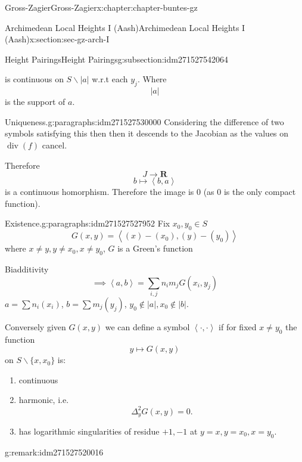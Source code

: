 \documentclass[oneside,10pt,]{book}
\numberwithin{equation}{section}
\newcommand{\pair}[2]{\left\langle #1, #2 \right\rangle}
\newcommand{\RR}{\mathbf{R}}
\DeclareMathOperator{\divisor}{div}
\begin{document}
\begin{chapterptx}{Gross-Zagier}{}{Gross-Zagier}{}{}{x:chapter:chapter-buntes-gz}
\begin{sectionptx}{Archimedean Local Heights I (Aash)}{}{Archimedean Local Heights I (Aash)}{}{}{x:section:sec-gz-arch-I}
\begin{subsectionptx}{Height Pairings}{}{Height Pairings}{}{}{g:subsection:idm271527542064}
\begin{enumerate}
\begin{equation*}
\end{equation*}
is continuous on \(S\smallsetminus |a|\) w.r.t each \(y_j\). Where%
\begin{equation*}
|a|
\end{equation*}
is the support of \(a\).%
\end{enumerate}
%
\begin{paragraphs}{Uniqueness.}{g:paragraphs:idm271527530000}%
Considering the difference of two symbols satisfying this then then it descends to the Jacobian as the values on \(\divisor(f)\) cancel.%
\par
Therefore%
\begin{equation*}
J\to \RR
\end{equation*}
%
\begin{equation*}
b\mapsto \pair b a
\end{equation*}
is a continuous homorphism. Therefore the image is 0 (as 0 is the only compact function).%
\end{paragraphs}%
\begin{paragraphs}{Existence.}{g:paragraphs:idm271527527952}%
Fix \(x_0, y_0 \in S\)%
\begin{equation*}
G(x,y)  = \pair{(x)  - (x_0)}{ (y) - (y_0)}
\end{equation*}
where \(x\ne y,y\ne x_0,x\ne y_0\), \(G\) is a Green's function%
\par
Biadditivity%
\begin{equation*}
\implies \pair ab = \sum_{i,j} n_i m_j G(x_i, y_j)
\end{equation*}
\(a = \sum n_i(x_i)\), \(b = \sum m_j(y_j)\), \(y_0 \not \in |a|,x_0 \not \in |b|\).%
\par
Conversely given \(G(x,y)\) we can define a symbol \(\pair \cdot \cdot\) if for fixed \(x \ne y_0\) the function%
\begin{equation*}
y \mapsto G(x,y)
\end{equation*}
on \(S\smallsetminus\{x,x_0\}\) is:%
\begin{enumerate}
\item{}continuous%
\item{}harmonic, i.e.%
\begin{equation*}
\Delta _y^2 G(x,y) = 0\text{.}
\end{equation*}
%
\item{}has logarithmic singularities of residue \(+1,-1\) at \(y=x,y=x_0, x=y_0\).%
\end{enumerate}
%
\begin{remark}{}{g:remark:idm271527520016}%

\end{remark}
\end{paragraphs}
\end{subsectionptx}
\end{sectionptx}
\end{chapterptx}
\end{document}
